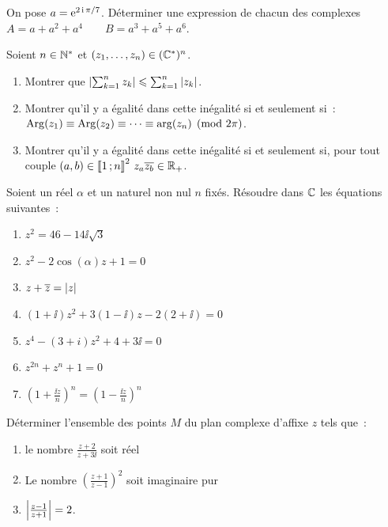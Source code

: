 \begin{exercice}
    On pose \(a = \operatorname{e}^{2\operatorname{i}\pi/7}\). Déterminer une expression de chacun des 
    complexes \(A = a + a^2 + a^4 \qquad B = a^3 + a^5 + a^6\).
\end{exercice}

\begin{exercice}
    Soient \(n \in \mathbb{N}^{*}\) et \((z_1, \ldots, z_n) \in (\mathbb{C}^{*})^n\).
    \begin{enumerate}
        \item Montrer que \( \left\lvert\sum_{k = 1}^n z_k\right\rvert \leqslant \sum_{k = 1}^n 
            \left\lvert z_k\right\rvert\).
        \item Montrer qu'il y a égalité dans cette inégalité si et seulement 
            si~: \(\operatorname{Arg}(z_1) \equiv \operatorname{Arg}(z_2) \equiv \cdots \equiv \arg(z_n) 
            \pmod{2\pi}\).
        \item Montrer qu'il y a égalité dans cette inégalité si et seulement si, 
            pour tout couple \((a,b) \in \mathopen{\llbracket}1\mathclose{}\mathpunct{};n\mathclose{\rrbracket}^2 \ z_a 
            \overline{z_b} \in \mathbb{R}_{+}\).
    \end{enumerate}
\end{exercice}

\begin{exercice}
    Soient un réel \(\alpha\) et un naturel non nul \(n\) fixés. Résoudre dans 
    \(\mathbb{C}\) les équations suivantes~:
    \begin{multicols}{2}
        \begin{enumerate}
            \item \(z^2 = 46-14\ii\sqrt{3}\)
            \item \(z^2-2\cos(\alpha)z + 1 = 0\)
            \item \(z + \overline{z} = \left\lvert z\right\rvert\)
            \item \((1 + \ii)z^2 + 3(1-\ii)z-2(2 + \ii) = 0\)
            \item \(z^4-(3 + i)z^2 + 4 + 3\ii = 0\)
            \item \(z^{2n} + z^n + 1 = 0\)
            \item \(\left( 1 + \frac{\ii z}{n} \right)^n = \left( 1-\frac{\ii 
                z}{n} \right)^n\)
        \end{enumerate}
    \end{multicols}
\end{exercice}

\begin{exercice}
    Déterminer l'ensemble des points \(M\) du plan complexe d'affixe \(z\) tels 
    que~:
    \begin{enumerate}
        \item le nombre \(\frac{z + 2}{z + 3\ii}\) soit réel
        \item Le nombre \(\left( \frac{z + 1}{z-1} \right)^2\) soit imaginaire 
            pur
        \item \(\left\lvert\frac{z-1}{z + 1}\right\rvert = 2\).
    \end{enumerate}
\end{exercice}

